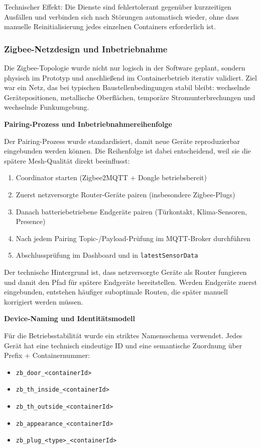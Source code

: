 Technischer Effekt: Die Dienste sind fehlertolerant gegenüber kurzzeitigen Ausfällen und verbinden sich nach Störungen automatisch wieder, ohne dass manuelle Reinitialisierung jedes einzelnen Containers erforderlich ist.

\subsubsection{Zigbee-Netzdesign und Inbetriebnahme}

Die Zigbee-Topologie wurde nicht nur logisch in der Software geplant, sondern physisch im Prototyp und anschließend im Containerbetrieb iterativ validiert. Ziel war ein Netz, das bei typischen Baustellenbedingungen stabil bleibt: wechselnde Gerätepositionen, metallische Oberflächen, temporäre Stromunterbrechungen und wechselnde Funkumgebung.

\textbf{Pairing-Prozess und Inbetriebnahmereihenfolge}

Der Pairing-Prozess wurde standardisiert, damit neue Geräte reproduzierbar eingebunden werden können. Die Reihenfolge ist dabei entscheidend, weil sie die spätere Mesh-Qualität direkt beeinflusst:

\begin{enumerate}
    \item Coordinator starten (Zigbee2MQTT + Dongle betriebsbereit)
    \item Zuerst netzversorgte Router-Geräte pairen (insbesondere Zigbee-Plugs)
    \item Danach batteriebetriebene Endgeräte pairen (Türkontakt, Klima-Sensoren, Presence)
    \item Nach jedem Pairing Topic-/Payload-Prüfung im MQTT-Broker durchführen
    \item Abschlussprüfung im Dashboard und in \texttt{latestSensorData}
\end{enumerate}

Der technische Hintergrund ist, dass netzversorgte Geräte als Router fungieren und damit den Pfad für spätere Endgeräte bereitstellen. Werden Endgeräte zuerst eingebunden, entstehen häufiger suboptimale Routen, die später manuell korrigiert werden müssen.

\textbf{Device-Naming und Identitätsmodell}

Für die Betriebsstabilität wurde ein striktes Namensschema verwendet. Jedes Gerät hat eine technisch eindeutige ID und eine semantische Zuordnung über Prefix + Containernummer:

\begin{itemize}
    \item \texttt{zb\_door\_<containerId>}
    \item \texttt{zb\_th\_inside\_<containerId>}
    \item \texttt{zb\_th\_outside\_<containerId>}
    \item \texttt{zb\_appearance\_<containerId>}
    \item \texttt{zb\_plug\_<type>\_<containerId>}
\end{itemize}

